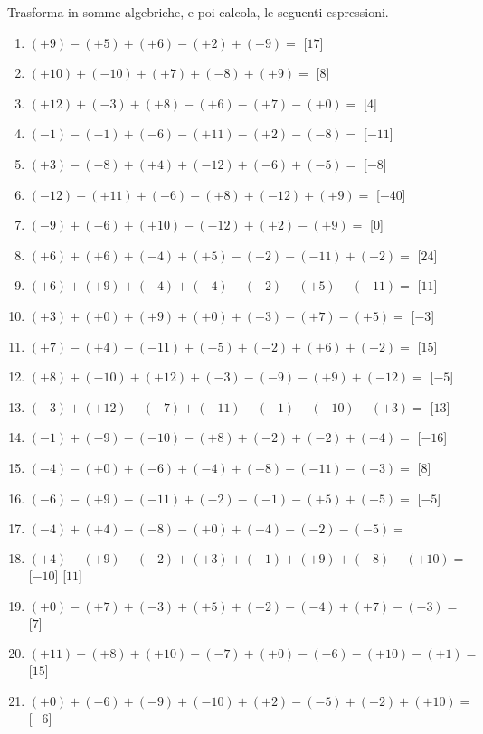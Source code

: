 \begin{esercizio}
Trasforma in somme algebriche, e poi calcola, le seguenti espressioni.
 \label{ese:as}
 \begin{enumerate}[noitemsep, label=(\alph*)]
\item \((+9) - (+5) + (+6) - (+2) + (+9) =\)
\hfill [\(17\)]
\item \((+10) + (-10) + (+7) + (-8) + (+9) =\)
\hfill [\(8\)]
\item \((+12) + (-3) + (+8) - (+6) - (+7) - (+0) =\)
\hfill [\(4\)]
\item \((-1) - (-1) + (-6) - (+11) - (+2) - (-8) =\)
\hfill [\(-11\)]
\item \((+3) - (-8) + (+4) + (-12) + (-6) + (-5) =\)
\hfill [\(-8\)]
\item \((-12) - (+11) + (-6) - (+8) + (-12) + (+9) =\)
\hfill [\(-40\)]
\item \((-9) + (-6) + (+10) - (-12) + (+2) - (+9) =\)
\hfill [\(0\)]
\item \((+6) + (+6) + (-4) + (+5) - (-2) - (-11) + (-2) =\)
\hfill [\(24\)]
\item \((+6) + (+9) + (-4) + (-4) - (+2) - (+5) - (-11) =\)
\hfill [\(11\)]
\item \((+3) + (+0) + (+9) + (+0) + (-3) - (+7) - (+5) =\)
\hfill [\(-3\)]
\item \((+7) - (+4) - (-11) + (-5) + (-2) + (+6) + (+2) =\)
\hfill [\(15\)]
\item \((+8) + (-10) + (+12) + (-3) - (-9) - (+9) + (-12) =\)
\hfill [\(-5\)]
\item \((-3) + (+12) - (-7) + (-11) - (-1) - (-10) - (+3) =\)
\hfill [\(13\)]
\item \((-1) + (-9) - (-10) - (+8) + (-2) + (-2) + (-4) =\)
\hfill [\(-16\)]
\item \((-4) - (+0) + (-6) + (-4) + (+8) - (-11) - (-3) =\)
\hfill [\(8\)]
\item \((-6) - (+9) - (-11) + (-2) - (-1) - (+5) + (+5) =\)
\hfill [\(-5\)]
\item \((-4) + (+4) - (-8) - (+0) + (-4) - (-2) - (-5) =\)
\item \((+4) - (+9) - (-2) + (+3) + (-1) + (+9) + (-8) - (+10) =\)
\hfill [\(-10\)]
\hfill [\(11\)]
\item \((+0) - (+7) + (-3) + (+5) + (-2) - (-4) + (+7) - (-3) =\)
\hfill [\(7\)]
\item \((+11) - (+8) + (+10) - (-7) + (+0) - (-6) - (+10) - (+1) =\)
\hfill [\(15\)]
\item \((+0) + (-6) + (-9) + (-10) + (+2) - (-5) + (+2) + (+10) =\)
\hfill [\(-6\)]
\end{enumerate}
\end{esercizio}

